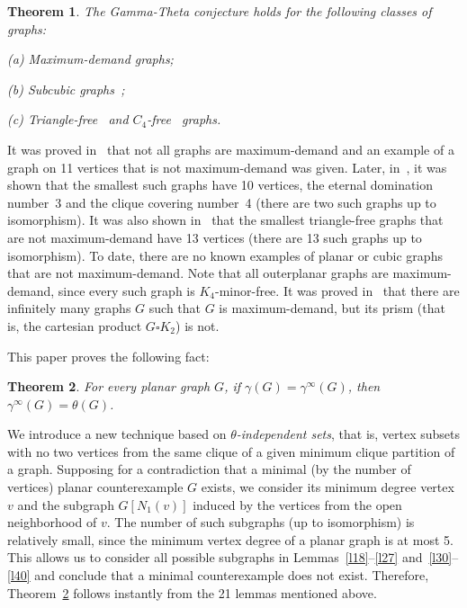 \documentclass[12pt]{article}
\newtheorem{theorem}{Theorem}
\begin{document}
\begin{theorem}
The Gamma-Theta conjecture holds for the following classes of graphs:

(a) Maximum-demand graphs;

(b) Subcubic graphs~\cite{KM15};

(c) Triangle-free~\cite{KM15} and $C_4$-free~\cite{KKM18} graphs.
\end{theorem}

 It was proved in~\cite{GHH05} that not all graphs are maximum-demand and an example of a graph on 11 vertices that is not maximum-demand was given. Later, in~\cite{MMV22}, it was shown that the smallest such graphs have 10 vertices, the eternal domination number~3 and the clique covering number~4 (there are two such graphs up to isomorphism). It was also shown in~\cite{MMV22} that the smallest triangle-free graphs that are not maximum-demand have 13 vertices (there are 13 such graphs up to isomorphism).  To date, there are no known examples of planar or cubic graphs that are not maximum-demand. Note that all outerplanar graphs are maximum-demand, since every such graph is $K_4$-minor-free.  It was proved in~\cite{KSV20} that there are infinitely many graphs $G$ such that $G$ is maximum-demand, but its prism (that is, the cartesian product $G \square K_2$) is not.



This paper proves the following fact:

\begin{theorem}\label{thm3}
For every planar graph $G$, if $\gamma(G) = \gamma^{\infty}(G)$, then $\gamma^{\infty}(G) = \theta(G)$.
\end{theorem}

We introduce a new technique based on \textit{$\theta$-independent sets}, that is, vertex subsets with no two vertices from the same clique of a given minimum clique partition of a graph. Supposing for a contradiction that a minimal (by the number of vertices) planar counterexample $G$ exists, we consider its minimum degree vertex $v$ and the subgraph $G[N_1(v)]$ induced by the vertices from the open neighborhood of $v$. The number of such subgraphs (up to isomorphism) is relatively small, since the minimum vertex degree of a planar graph is at most 5. This allows us to consider all possible subgraphs in Lemmas~\ref{l18}--\ref{l27} and~\ref{l30}--\ref{l40} and conclude that a minimal counterexample does not exist. Therefore, Theorem~\ref{thm3} follows instantly from the 21 lemmas mentioned above.
\end{document}
